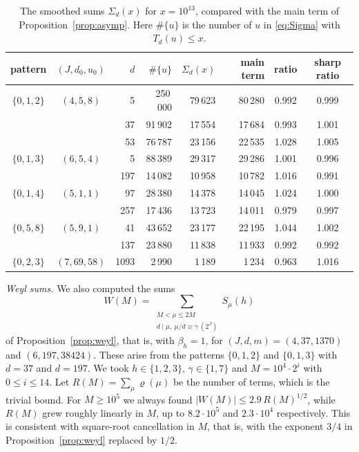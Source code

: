 \documentclass[11pt]{amsart}
\theoremstyle{remark}
\theoremstyle{definition}
\numberwithin{equation}{section}
\begin{document}
\begin{table}[h]
\centering
\setlength{\tabcolsep}{7pt}
\begin{tabular}{ccrrrrcc}
\toprule
pattern & $(J,d_0,u_0)$ & $d$ & $\#\{u\}$ & $\Sigma_d(x)$ & main term & ratio & sharp ratio\\
\midrule
$\{0,1,2\}$ & $(4,5,8)$ & 5 & 250\,000 & 79\,623 & 80\,280 & 0.992 & 0.999\\
 & & 37 & 91\,902 & 17\,554 & 17\,684 & 0.993 & 1.001\\
 & & 53 & 76\,787 & 23\,156 & 22\,535 & 1.028 & 1.005\\
$\{0,1,3\}$ & $(6,5,4)$ & 5 & 88\,389 & 29\,317 & 29\,286 & 1.001 & 0.996\\
 & & 197 & 14\,082 & 10\,958 & 10\,782 & 1.016 & 0.991\\
$\{0,1,4\}$ & $(5,1,1)$ & 97 & 28\,380 & 14\,378 & 14\,045 & 1.024 & 1.000\\
 & & 257 & 17\,436 & 13\,723 & 14\,011 & 0.979 & 0.997\\
$\{0,5,8\}$ & $(5,9,1)$ & 41 & 43\,652 & 23\,177 & 22\,195 & 1.044 & 1.002\\
 & & 137 & 23\,880 & 11\,838 & 11\,933 & 0.992 & 0.992\\
$\{0,2,3\}$ & $(7,69,58)$ & 1093 & 2\,990 & 1\,189 & 1\,234 & 0.963 & 1.016\\
\bottomrule
\end{tabular}
\caption{The smoothed sums $\Sigma_d(x)$ for $x=10^{13}$, compared with the main term of Proposition~\ref{prop:asymp}. Here $\#\{u\}$ is the number of $u$ in \eqref{eq:Sigma} with $T_d(u)\le x$.}
\label{tab:main}
\end{table}

\emph{Weyl sums.} We also computed the sums
\[
W(M)=\sum_{\substack{M<\mu\le2M\\ d\mid\mu,\ \mu/d\equiv\gamma\ (2^J)}}S_\mu(h)
\]
of Proposition~\ref{prop:weyl}, that is, with $\beta_h=1$, for $(J,d,m)=(4,37,1370)$ and $(6,197,38424)$. These arise from the patterns $\{0,1,2\}$ and $\{0,1,3\}$ with $d=37$ and $d=197$. We took $h\in\{1,2,3\}$, $\gamma\in\{1,7\}$ and $M=10^4\cdot2^i$ with $0\le i\le14$. Let $R(M)=\sum_\mu\varrho(\mu)$ be the number of terms, which is the trivial bound. For $M\ge10^5$ we always found $|W(M)|\le2.9\,R(M)^{1/2}$, while $R(M)$ grew roughly linearly in $M$, up to $8.2\cdot10^5$ and $2.3\cdot10^4$ respectively. This is consistent with square-root cancellation in $M$, that is, with the exponent $3/4$ in Proposition~\ref{prop:weyl} replaced by $1/2$.
\end{document}
